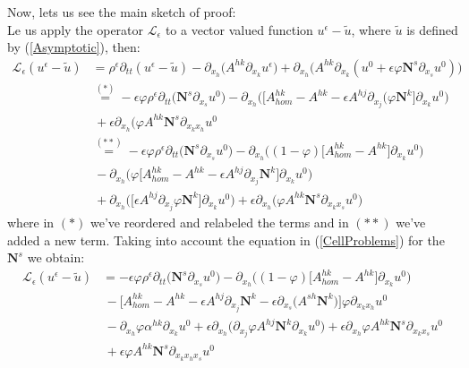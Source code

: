Now, lets us see the main sketch of proof:\\

Le us apply the operator $\mathcal{L}_{\epsilon}$ to a vector valued function $u^{\epsilon}-\tilde{u}$, where $\tilde{u}$ is defined by (\ref{Asymptotic}), then:
\begin{align*}
    \mathcal{L}_{\epsilon} (u^{\epsilon}-\tilde{u}) &= \rho^{\epsilon} \partial_{tt} (u^{\epsilon}-\tilde{u}) - \partial_{x_h} \big( A^{hk}\partial_{x_k} u^{\epsilon} \big) + \partial_{x_h} \big( A^{hk}\partial_{x_k} (u^0 + \epsilon \varphi \mathbf{N}^s \partial_{x_s}u^0 )\big) \\
    & \overset{(*)}{=} - \epsilon \varphi \rho^{\epsilon} \partial_{tt} \big( \mathbf{N}^s \partial_{x_s}u^0 \big) - \partial_{x_h} \big( \big[ A^{hk}_{hom} - A^{hk} - \epsilon A^{hj}\partial_{x_j} (\varphi \mathbf{N}^k \big] \partial_{x_k} u^0\big) \\
    &\, + \epsilon \partial_{x_h} \big( \varphi A^{hk} \mathbf{N}^s \partial_{x_k x_h} u^0 \\
    & \overset{(**)}{=} - \epsilon \varphi \rho^{\epsilon} \partial_{tt} \big( \mathbf{N}^s \partial_{x_s}u^0 \big) - \partial_{x_h} \big( (1-\varphi) \big[ A^{hk}_{hom} - A^{hk} \big] \partial_{x_k} u^0 \big)  \\
    &\, - \partial_{x_h} \big( \varphi \big[ A^{hk}_{hom} - A^{hk} - \epsilon A^{hj} \partial_{x_j} \mathbf{N}^k \big] \partial_{x_k} u^0 \big) \\
    &\, + \partial_{x_h} \big( \big[ \epsilon A^{hj} \partial_{x_j} \varphi \mathbf{N}^k \big] \partial_{x_k} u^0 \big) + \epsilon \partial_{x_h} \big( \varphi A^{hk} \mathbf{N}^s \partial_{x_k x_s} u^0 \big) 
\end{align*}
where in $(*)$ we've reordered and relabeled the terms and in $(**)$ we've added a new term.
Taking into account the equation in (\ref{CellProblems}) for the $\mathbf{N}^s$ we obtain:
\begin{align*}
    \mathcal{L}_{\epsilon} (u^{\epsilon} - \tilde{u}) & = - \epsilon \varphi \rho^{\epsilon} \partial_{tt} \big( \mathbf{N}^s \partial_{x_s} u^0 \big) - \partial_{x_h} \big( (1-\varphi) \big[ A^{hk}_{hom} - A^{hk} \big] \partial_{x_k} u^0 \big) \\
    & \, - \big[ A^{hk}_{hom} - A^{hk} - \epsilon A^{hj} \partial_{x_j} \mathbf{N}^k - \epsilon \partial_{x_s} \big( A^{sh}\mathbf{N}^k \big) \big] \varphi \partial_{x_k x_h} u^0 \\
    &\, - \partial_{x_h} \varphi \alpha^{hk} \partial_{x_k} u^0 + \epsilon \partial_{x_h} \big( \partial_{x_j} \varphi A^{hj} \mathbf{N}^k \partial_{x_k} u^0 \big) + \epsilon \partial_{x_h} \varphi A^{hk} \mathbf{N}^s \partial_{x_k x_s} u^0 \\
    & \, + \epsilon \varphi A^{hk} \mathbf{N}^s \partial_{x_k x_h x_s} u^0
\end{align*}
